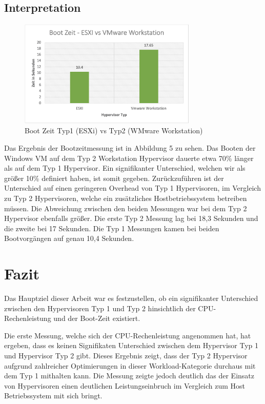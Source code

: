 \documentclass[conference]{IEEEtran}
\begin{document}
\subsection{Interpretation}
\begin{figure}[!h]
	\centering
	\includegraphics[keepaspectratio,width=8.5cm,height=0.75\textheight]{bootzeit.png}
	\caption{Boot Zeit Typ1 (ESXi) vs Typ2 (WMware Workstation)}
	\label{boottime}
\end{figure}

Das Ergebnis der Bootzeitmessung ist in Abbildung 5 zu sehen. Das Booten der Windows VM auf dem Typ 2 Workstation Hypervisor dauerte etwa 70\% länger als auf dem Typ 1 Hypervisor. Ein signifikanter Unterschied, welchen wir als größer 10\% definiert haben, ist somit gegeben. Zurückzuführen ist der Unterschied auf einen geringeren Overhead von Typ 1 Hypervisoren, im Vergleich zu Typ 2 Hypervisoren, welche ein zusätzliches Hostbetriebssystem betreiben müssen. Die Abweichung zwischen den beiden Messungen war bei dem Typ 2 Hypervisor ebenfalls größer. Die erste Typ 2 Messung lag bei 18,3 Sekunden und die zweite bei 17 Sekunden. Die Typ 1 Messungen kamen bei beiden Bootvorgängen auf genau 10,4 Sekunden.


\section{Fazit}
\label{Fazit}
Das Hauptziel dieser Arbeit war es festzustellen, ob ein signifikanter Unterschied zwischen den Hypervisoren Typ 1 und Typ 2 hinsichtlich der CPU-Rechenleistung und der Boot-Zeit existiert. 

Die erste Messung, welche sich der CPU-Rechenleistung angenommen hat, hat ergeben, dass es keinen Signifikaten Unterschied zwischen dem Hypervisor Typ 1 und Hypervisor Typ 2 gibt. Dieses Ergebnis zeigt, dass der Typ 2 Hypervisor aufgrund zahlreicher Optimierungen in dieser Workload-Kategorie durchaus mit dem Typ 1 mithalten kann. Die Messung zeigte jedoch deutlich das der Einsatz von Hypervisoren einen deutlichen Leistungseinbruch im Vergleich zum Host Betriebssystem mit sich bringt. 
\end{document}
